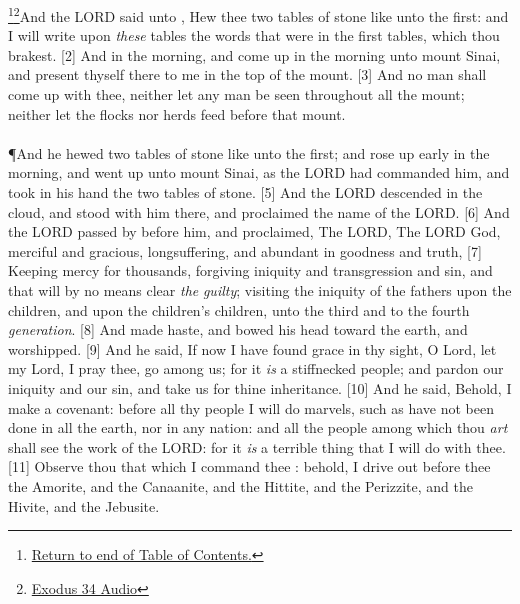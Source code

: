 \footnote{\textcolor[cmyk]{0.99998,1,0,0}{\hyperlink{TOC}{Return to end of Table of Contents.}}}\footnote{\href{https://audiobible.com/bible/exodus_34.html}{\textcolor[cmyk]{0.99998,1,0,0}{Exodus 34 Audio}}}\textcolor[cmyk]{0.99998,1,0,0}{And the LORD said unto , Hew thee two tables of stone like unto the first: and I will write upon \emph{these} tables the words that were in the first tables, which thou brakest.}
[2] \textcolor[cmyk]{0.99998,1,0,0}{And  in the morning, and come up in the morning unto mount Sinai, and present thyself there to me in the top of the mount.}
[3] \textcolor[cmyk]{0.99998,1,0,0}{And no man shall come up with thee, neither let any man be seen throughout all the mount; neither let the flocks nor herds feed before that mount.}\\
\\
\P \textcolor[cmyk]{0.99998,1,0,0}{And he hewed two tables of stone like unto the first; and  rose up early in the morning, and went up unto mount Sinai, as the LORD had commanded him, and took in his hand the two tables of stone.}
[5] \textcolor[cmyk]{0.99998,1,0,0}{And the LORD descended in the cloud, and stood with him there, and proclaimed the name of the LORD.}
[6] \textcolor[cmyk]{0.99998,1,0,0}{And the LORD passed by before him, and proclaimed, The LORD, The LORD God, merciful and gracious, longsuffering, and abundant in goodness and truth,}
[7] \textcolor[cmyk]{0.99998,1,0,0}{Keeping mercy for thousands, forgiving iniquity and transgression and sin, and that will by no means clear \emph{the} \emph{guilty}; visiting the iniquity of the fathers upon the children, and upon the children's children, unto the third and to the fourth \emph{generation}.}
[8] \textcolor[cmyk]{0.99998,1,0,0}{And  made haste, and bowed his head toward the earth, and worshipped.}
[9] \textcolor[cmyk]{0.99998,1,0,0}{And he said, If now I have found grace in thy sight, O Lord, let my Lord, I pray thee, go among us; for it \emph{is} a stiffnecked people; and pardon our iniquity and our sin, and take us for thine inheritance.}
[10] \textcolor[cmyk]{0.99998,1,0,0}{And he said, Behold, I make a covenant: before all thy people I will do marvels, such as have not been done in all the earth, nor in any nation: and all the people among which thou \emph{art} shall see the work of the LORD: for it \emph{is} a terrible thing that I will do with thee.}
[11] \textcolor[cmyk]{0.99998,1,0,0}{Observe thou that which I command thee : behold, I drive out before thee the Amorite, and the Canaanite, and the Hittite, and the Perizzite, and the Hivite, and the Jebusite.}
